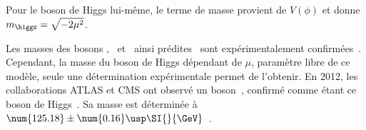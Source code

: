 Pour le boson de Higgs lui-même, le terme de masse provient de $V(\phi)$ et donne $m_{\higgs} = \sqrt{-2\mu^2}$.
\par Les masses des bosons \Wbosonpm, \photon\ et \Zboson\ ainsi prédites~\cite{Weinberg_leptons_model} sont expérimentalement confirmées~\cite{PDG_booklet_2018,Wboson_discovery1,Wboson_discovery2,Zboson_discovery1,Zboson_discovery2,Wboson_discovery3}.
Cependant, la masse du boson de Higgs dépendant de $\mu$, paramètre libre de ce modèle, seule une détermination expérimentale permet de l'obtenir. En 2012, les collaborations ATLAS et CMS ont observé un boson~\cite{ATLAS_Higgs_discovery,CMS_Higgs_discovery,CMS_Higgs_discovery_2013}, confirmé comme étant ce boson de Higgs~\cite{ATLAS-CMS-Higgs_combined_1,ATLAS-CMS-Higgs_combined_2}. Sa masse est déterminée à $\num{125.18}\pm\num{0.16}\usp\SI{}{\GeV}$~\cite{PDG_booklet_2018}.
